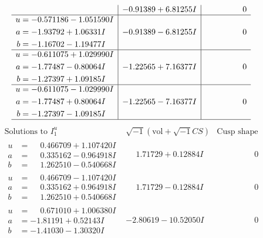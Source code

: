 \documentclass[1p]{elsarticle_modified}
\theoremstyle{definition}
\newcommand{\I}{\sqrt{-1}}
\begin{document}
$$\begin{array}{c|c|c}
 & -0.91389 + 6.81255 I & \phantom{-0.000000 } 0 \\ \hline\begin{aligned}
u &= -0.571186 - 1.051590 I \\
a &= -1.93792 + 1.06331 I \\
b &= -1.16702 - 1.19477 I\end{aligned}
 & -0.91389 - 6.81255 I & \phantom{-0.000000 } 0 \\ \hline\begin{aligned}
u &= -0.611075 + 1.029990 I \\
a &= -1.77487 - 0.80064 I \\
b &= -1.27397 + 1.09185 I\end{aligned}
 & -1.22565 + 7.16377 I & \phantom{-0.000000 } 0 \\ \hline\begin{aligned}
u &= -0.611075 - 1.029990 I \\
a &= -1.77487 + 0.80064 I \\
b &= -1.27397 - 1.09185 I\end{aligned}
 & -1.22565 - 7.16377 I & \phantom{-0.000000 } 0\\
 \hline 
 \end{array}$$\newpage$$\begin{array}{c|c|c}  
\text{Solutions to }I^u_{1}& \I (\text{vol} + \sqrt{-1}CS) & \text{Cusp shape}\\
 \hline 
\begin{aligned}
u &= \phantom{-}0.466709 + 1.107420 I \\
a &= \phantom{-}0.335162 - 0.964918 I \\
b &= \phantom{-}1.262510 - 0.540668 I\end{aligned}
 & \phantom{-}1.71729 + 0.12884 I & \phantom{-0.000000 } 0 \\ \hline\begin{aligned}
u &= \phantom{-}0.466709 - 1.107420 I \\
a &= \phantom{-}0.335162 + 0.964918 I \\
b &= \phantom{-}1.262510 + 0.540668 I\end{aligned}
 & \phantom{-}1.71729 - 0.12884 I & \phantom{-0.000000 } 0 \\ \hline\begin{aligned}
u &= \phantom{-}0.671010 + 1.006380 I \\
a &= -1.81191 + 0.52143 I \\
b &= -1.41030 - 1.30320 I\end{aligned}
 & -2.80619 - 10.52050 I & \phantom{-0.000000 } 0 \\ \hline\begin{aligned}

\end{aligned}
\end{array}$$
\end{document}
